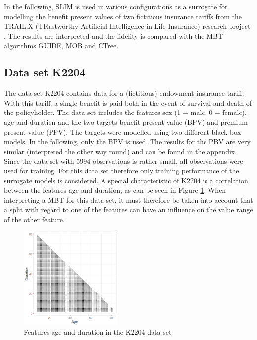 In the following, SLIM is used in various configurations as a surrogate for modelling the benefit present values of two fictitious insurance tariffs from the TRAIL.X (TRustworthy Artificial Intelligence in Life Insurance) research project \citep{msginsurit.16.03.2023}. The results are interpreted and the fidelity is compared with the MBT algorithms GUIDE, MOB and CTree.

\subsection{Data set K2204} \label{K2204_BPV}

The data set K2204 contains data for a (fictitious) endowment insurance tariff. With this tariff, a single benefit is paid both in the event of survival and death of the policyholder. The data set includes the features sex (1 = male, 0 = female), age and duration and the two targets benefit present value (BPV) and premium present value (PPV). The targets were modelled using two different black box models.  
In the following, only the BPV is used. The results for the PBV are very similar (interpreted the other way round) and can be found in the appendix.
Since the data set with 5994 observations is rather small, all observations were used for training. For this data set therefore only training performance of the surrogate models is considered.
A special characteristic of K2204 is a correlation between the features age and duration, as can be seen in Figure \ref{fig:ins_corr_age_duration}. When interpreting a MBT for this data set, it must therefore be taken into account that a split with regard to one of the features can have an influence on the value range of the other feature.

\begin{figure}[!htb]
    \centering    
    \includegraphics[width=5cm]{Figures/insurance_use_case/k2204_BPV/corr_age_duration.png}
    \caption{Features age and duration in the K2204 data set}
    \label{fig:ins_corr_age_duration}
\end{figure}



